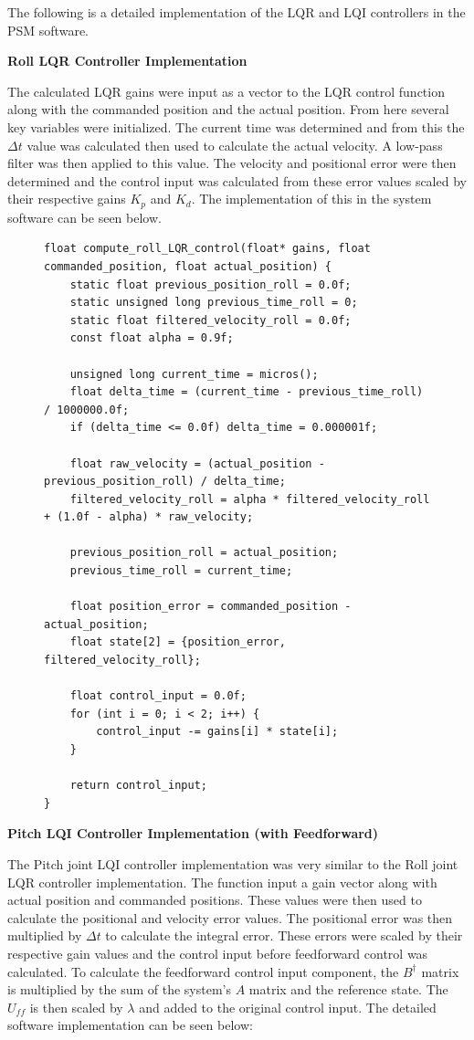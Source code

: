 The following is a detailed implementation of the LQR and LQI controllers in the PSM software. 

\textbf{Roll LQR Controller Implementation}

The calculated LQR gains were input as a vector to the LQR control function along with the commanded position and the actual position. From here several key variables were initialized. The current time was determined and from this the $\Delta t$ value was calculated then used to calculate the actual velocity. A low-pass filter was then applied to this value. The velocity and positional error were then determined and the control input was calculated from these error values scaled by their respective gains $K_p$ and $K_d$. The implementation of this in the system software can be seen below.

\begin{figure}[H]
\centering
\begin{lstlisting}[caption={Roll LQR Control Input Calculation}, label={lst:roll_lqr_control}]
float compute_roll_LQR_control(float* gains, float commanded_position, float actual_position) {
    static float previous_position_roll = 0.0f;
    static unsigned long previous_time_roll = 0;
    static float filtered_velocity_roll = 0.0f;
    const float alpha = 0.9f;

    unsigned long current_time = micros();
    float delta_time = (current_time - previous_time_roll) / 1000000.0f;
    if (delta_time <= 0.0f) delta_time = 0.000001f;

    float raw_velocity = (actual_position - previous_position_roll) / delta_time;
    filtered_velocity_roll = alpha * filtered_velocity_roll + (1.0f - alpha) * raw_velocity;

    previous_position_roll = actual_position;
    previous_time_roll = current_time;

    float position_error = commanded_position - actual_position;
    float state[2] = {position_error, filtered_velocity_roll};

    float control_input = 0.0f;
    for (int i = 0; i < 2; i++) {
        control_input -= gains[i] * state[i];
    }

    return control_input;
}
\end{lstlisting}
\end{figure}

\textbf{Pitch LQI Controller Implementation (with Feedforward)}

The Pitch joint LQI controller implementation was very similar to the Roll joint LQR controller implementation. The function input a gain vector along with actual position and commanded positions. These values were then used to calculate the positional and velocity error values. The positional error was then multiplied by $\Delta t$ to calculate the integral error. These errors were scaled by their respective gain values and the control input before feedforward control was calculated. To calculate the feedforward control input component, the $B^\dagger$ matrix is multiplied by the sum of the system's $A$ matrix and the reference state. The $U_{ff}$ is then scaled by $\lambda$ and added to the original control input. The detailed software implementation can be seen below:

